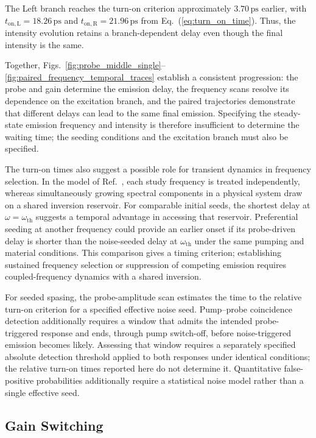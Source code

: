 \documentclass{optica-article}
\begin{document}
The Left branch reaches the turn-on criterion approximately $3.70\,\mathrm{ps}$ earlier, with $t_{\mathrm{on,L}}=18.26\,\mathrm{ps}$ and $t_{\mathrm{on,R}}=21.96\,\mathrm{ps}$ from Eq.~(\ref{eq:turn_on_time}). Thus, the intensity evolution retains a branch-dependent delay even though the final intensity is the same.

Together, Figs.~\ref{fig:probe_middle_single}--\ref{fig:paired_frequency_temporal_traces} establish a consistent progression: the probe and gain determine the emission delay, the frequency scans resolve its dependence on the excitation branch, and the paired trajectories demonstrate that different delays can lead to the same final emission. Specifying the steady-state emission frequency and intensity is therefore insufficient to determine the waiting time; the seeding conditions and the excitation branch must also be specified. 

The turn-on times also suggest a possible role for transient dynamics in frequency selection. In the model of Ref.~\cite{Aradian:2024}, each study frequency is treated independently, whereas simultaneously growing spectral components in a physical system draw on a shared inversion reservoir. For comparable initial seeds, the shortest delay at $\omega=\omega_{\mathrm{th}}$ suggests a temporal advantage in accessing that reservoir. Preferential seeding at another frequency could provide an earlier onset if its probe-driven delay is shorter than the noise-seeded delay at $\omega_{\mathrm{th}}$ under the same pumping and material conditions. This comparison gives a timing criterion; establishing sustained frequency selection or suppression of competing emission requires coupled-frequency dynamics with a shared inversion.

For seeded spasing, the probe-amplitude scan estimates the time to the relative turn-on criterion for a specified effective noise seed. Pump--probe coincidence detection additionally requires a window that admits the intended probe-triggered response and ends, through pump switch-off, before noise-triggered emission becomes likely. Assessing that window requires a separately specified absolute detection threshold applied to both responses under identical conditions; the relative turn-on times reported here do not determine it. Quantitative false-positive probabilities additionally require a statistical noise model rather than a single effective seed.

\subsection{Gain Switching}
\label{sec:gain_switching}
\end{document}
